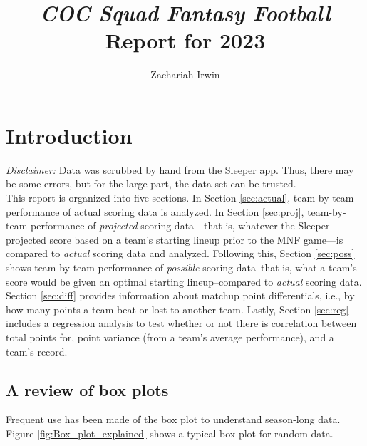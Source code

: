 \documentclass[12pt,letterpaper]{article}
\begin{document}
\title{\textit{COC Squad Fantasy Football} \\ Report for 2023}

\author{Zachariah Irwin}

\clearpage\maketitle
\titlingpage
\clearpage
\setcounter{page}{1}
\tableofcontents

\clearpage



\section{Introduction}
\textit{Disclaimer:} Data was scrubbed by hand from the Sleeper app. Thus, there may be some errors, but for the large part, the data set can be trusted.\\

This report is organized into five sections. In Section \ref{sec:actual}, team-by-team performance of actual scoring data is analyzed. In Section \ref{sec:proj}, team-by-team performance of \textit{projected} scoring data---that is, whatever the Sleeper projected score based on a team's starting lineup prior to the MNF game---is compared to \textit{actual} scoring data and analyzed. Following this, Section \ref{sec:poss} shows team-by-team performance of \textit{possible} scoring data--that is, what a team's score would be given an optimal starting lineup--compared to \textit{actual} scoring data. Section \ref{sec:diff} provides information about matchup point differentials, i.e., by how many points a team beat or lost to another team. Lastly, Section \ref{sec:reg} includes a regression analysis to test whether or not there is correlation between total points for, point variance (from a team's average performance), and a team's record.\\

\subsection{A review of box plots}
Frequent use has been made of the box plot to understand season-long data. Figure \ref{fig:Box_plot_explained} shows a typical box plot for random data.\\
\end{document}
